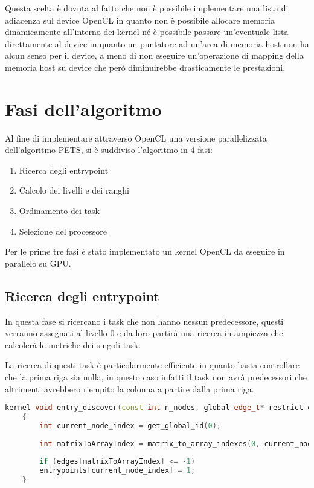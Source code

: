 Questa scelta è dovuta al fatto che non è possibile implementare una lista di adiacenza sul device OpenCL in quanto non è possibile allocare memoria dinamicamente all'interno dei kernel né è possibile passare un'eventuale lista direttamente al device in quanto un puntatore ad un'area di memoria host non ha alcun senso per il device, a meno di non eseguire un'operazione di mapping della memoria host su device che però diminuirebbe drasticamente le prestazioni.


\section{Fasi dell'algoritmo}
Al fine di implementare attraverso OpenCL una versione parallelizzata dell'algoritmo PETS, si è suddiviso l'algoritmo in 4 fasi:

\begin{enumerate}
	\item Ricerca degli entrypoint
	\item Calcolo dei livelli e dei ranghi
	\item Ordinamento dei task
	\item Selezione del processore
\end{enumerate}

Per le prime tre fasi è stato implementato un kernel OpenCL da eseguire in parallelo su GPU.

\subsection{Ricerca degli entrypoint}
In questa fase si ricercano i task che non hanno nessun predecessore, questi verranno assegnati al livello 0 e da loro partirà una ricerca in ampiezza che calcolerà le metriche dei singoli task.

La ricerca di questi task è particolarmente efficiente in quanto basta controllare che la prima riga sia nulla, in questo caso infatti il task non avrà predecessori che altrimenti avrebbero riempito la colonna a partire dalla prima riga.

\begin{lstlisting}[language=C++, caption={Find entrypoints kernel},captionpos=b]
	kernel void entry_discover(const int n_nodes, global edge_t* restrict edges, volatile global int* n_entries, global int* entrypoints)
	{
		int current_node_index = get_global_id(0);
		
		int matrixToArrayIndex = matrix_to_array_indexes(0, current_node_index, n_nodes);
		
		if (edges[matrixToArrayIndex] <= -1)
		entrypoints[current_node_index] = 1;
	}
\end{lstlisting}

